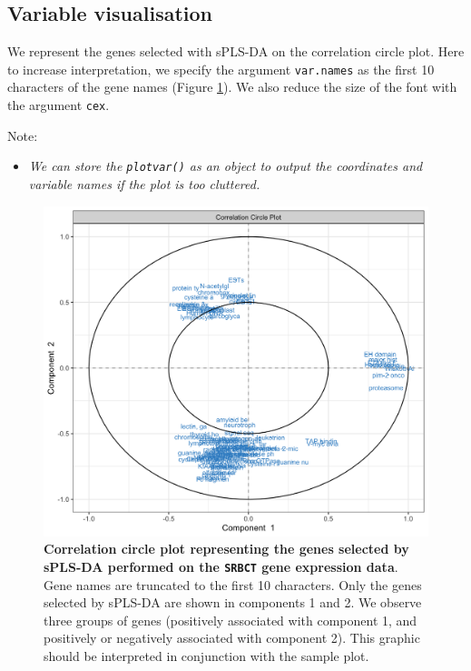 \documentclass[]{book}
\newenvironment{Shaded}{\begin{snugshade}}{\end{snugshade}}
\newcommand{\DataTypeTok}[1]{\textcolor[rgb]{0.13,0.29,0.53}{#1}}
\newcommand{\DecValTok}[1]{\textcolor[rgb]{0.00,0.00,0.81}{#1}}
\newcommand{\KeywordTok}[1]{\textcolor[rgb]{0.13,0.29,0.53}{\textbf{#1}}}
\newcommand{\NormalTok}[1]{#1}
\newcommand{\OperatorTok}[1]{\textcolor[rgb]{0.81,0.36,0.00}{\textbf{#1}}}
\newcommand{\StringTok}[1]{\textcolor[rgb]{0.31,0.60,0.02}{#1}}
\providecommand{\tightlist}{%
  \setlength{\itemsep}{0pt}\setlength{\parskip}{0pt}}
\begin{document}
\hypertarget{plsda:varplot}{%
\subsection{Variable visualisation}\label{plsda:varplot}}

We represent the genes selected with sPLS-DA on the correlation circle plot. Here to increase interpretation, we specify the argument \texttt{var.names} as the first 10 characters of the gene names (Figure \ref{fig:splsda-var}). We also reduce the size of the font with the argument \texttt{cex}.

Note:

\begin{itemize}
\tightlist
\item
  \emph{We can store the \texttt{plotvar()} as an object to output the coordinates and variable names if the plot is too cluttered.}
\end{itemize}

\begin{Shaded}
\end{Shaded}

\begin{figure}

{\centering \includegraphics[width=0.5\linewidth]{Figures/PLSDA/splsda-var-1} 

}

\caption{\textbf{Correlation circle plot representing the genes selected by sPLS-DA performed on the \texttt{SRBCT} gene expression data}. Gene names are truncated to the first 10 characters. Only the genes selected by sPLS-DA are shown in components 1 and 2. We observe three groups of genes (positively associated with component 1, and positively or negatively associated with component 2). This graphic should be interpreted in conjunction with the sample plot.}\label{fig:splsda-var}
\end{figure}
\end{document}

